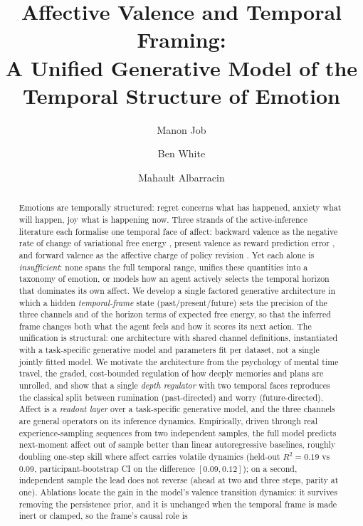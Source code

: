 \documentclass[11pt,a4paper]{article}
\title{Affective Valence and Temporal Framing:\\
A Unified Generative Model of the Temporal Structure of Emotion}
\author{Manon Job \and Ben White \and Mahault Albarracin}
\date{}
\begin{document}
\maketitle

\begin{abstract}
Emotions are temporally structured: regret concerns what has happened, anxiety what
will happen, joy what is happening now. Three strands of the active-inference
literature each formalise one temporal face of affect: backward valence as the
negative rate of change of variational free energy \citep{joffily2013emotional}, present
valence as reward prediction error \citep{pattisapu2024free}, and forward valence
as the affective charge of policy revision \citep{hesp2021deeply}. Yet each
alone is \emph{insufficient}: none spans the full temporal range, unifies these
quantities into a taxonomy of emotion, or models how an agent actively selects the
temporal horizon that dominates its own affect. We develop a single factored generative
architecture in which a hidden \emph{temporal-frame} state (past/present/future)
sets the precision of the three channels and of the horizon terms of expected free
energy, so that the inferred frame changes both what the agent feels and how it scores
its next action. The unification is structural: one architecture with shared channel
definitions, instantiated with a task-specific generative model and parameters fit per
dataset, not a single jointly fitted model. We motivate the architecture
from the psychology of mental time travel, the graded, cost-bounded regulation
of how deeply memories and plans are unrolled, and show that a single
\emph{depth regulator} with two temporal faces reproduces the classical split
between rumination (past-directed) and worry (future-directed). Affect is a
\emph{readout layer} over a task-specific generative model, and the three channels
are general operators on its inference dynamics. Empirically, driven through real experience-sampling sequences from two independent
samples, the full model predicts next-moment affect out of sample better than linear
autoregressive baselines, roughly doubling one-step skill where affect carries volatile
dynamics (held-out $R^2=0.19$ vs $0.09$, participant-bootstrap CI on the difference
$[0.09,0.12]$); on a second, independent sample the lead does not reverse (ahead at
two and three steps, parity at one). Ablations locate the gain in the model's valence
transition dynamics: it survives removing the persistence prior, and it is unchanged
when the temporal frame is made inert or clamped, so the frame's causal role is

\end{abstract}
\end{document}
